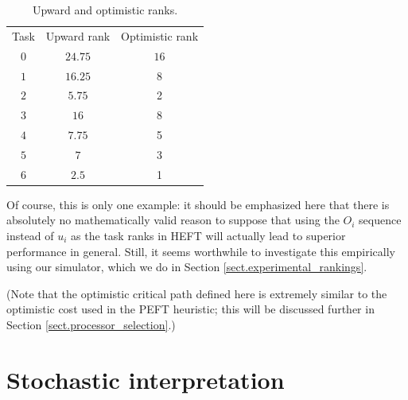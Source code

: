 \documentclass[12pt]{article}
\begin{document}
\begin{table}
	\caption{Upward and optimistic ranks.} 
	\begin{center}	
		\begin{tabular}{c c c}
			\cmidrule{1-3}
			Task & Upward rank & Optimistic rank\\
			\cmidrule{1-3}
			$0$ & $24.75$ & $16$ \\
			$1$ & $16.25$ & 8 \\
			$2$ & $5.75$ & 2 \\
			$3$ & $16$ & 8 \\
			$4$ & $7.75$ & 5 \\
			$5$ & $7$ & 3 \\
			$6$ & $2.5$ & 1 \\
			\bottomrule
		\end{tabular}
		\label{tb.opt_example}
	\end{center}	
\end{table}

Of course, this is only one example: it should be emphasized here that there is absolutely no mathematically valid reason to suppose that using the $O_i$ sequence instead of $u_i$ as the task ranks in HEFT will actually lead to superior performance in general. Still, it seems worthwhile to investigate this empirically using our simulator, which we do in Section \ref{sect.experimental_rankings}. 


(Note that the optimistic critical path defined here is extremely similar to the optimistic cost used in the PEFT heuristic; this will be discussed further in Section \ref{sect.processor_selection}.)


\section{Stochastic interpretation}
\label{sect.alt_rankings}
\end{document}
